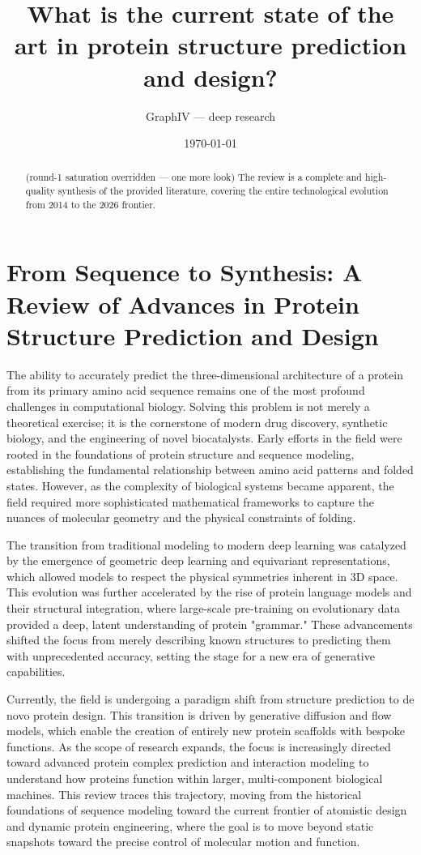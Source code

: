 \documentclass[11pt]{article}
\title{What is the current state of the art in protein structure prediction and design?}
\author{GraphIV --- deep research}
\date{\today}
\begin{document}
\maketitle

\begin{abstract}
(round-1 saturation overridden — one more look) The review is a complete and high-quality synthesis of the provided literature, covering the entire technological evolution from 2014 to the 2026 frontier.
\end{abstract}

\section{From Sequence to Synthesis: A Review of Advances in Protein Structure Prediction and Design}

The ability to accurately predict the three-dimensional architecture of a protein from its primary amino acid sequence remains one of the most profound challenges in computational biology. Solving this problem is not merely a theoretical exercise; it is the cornerstone of modern drug discovery, synthetic biology, and the engineering of novel biocatalysts. Early efforts in the field were rooted in the foundations of protein structure and sequence modeling, establishing the fundamental relationship between amino acid patterns and folded states. However, as the complexity of biological systems became apparent, the field required more sophisticated mathematical frameworks to capture the nuances of molecular geometry and the physical constraints of folding.

The transition from traditional modeling to modern deep learning was catalyzed by the emergence of geometric deep learning and equivariant representations, which allowed models to respect the physical symmetries inherent in 3D space. This evolution was further accelerated by the rise of protein language models and their structural integration, where large-scale pre-training on evolutionary data provided a deep, latent understanding of protein "grammar." These advancements shifted the focus from merely describing known structures to predicting them with unprecedented accuracy, setting the stage for a new era of generative capabilities.

Currently, the field is undergoing a paradigm shift from structure prediction to de novo protein design. This transition is driven by generative diffusion and flow models, which enable the creation of entirely new protein scaffolds with bespoke functions. As the scope of research expands, the focus is increasingly directed toward advanced protein complex prediction and interaction modeling to understand how proteins function within larger, multi-component biological machines. This review traces this trajectory, moving from the historical foundations of sequence modeling toward the current frontier of atomistic design and dynamic protein engineering, where the goal is to move beyond static snapshots toward the precise control of molecular motion and function.
\end{document}
